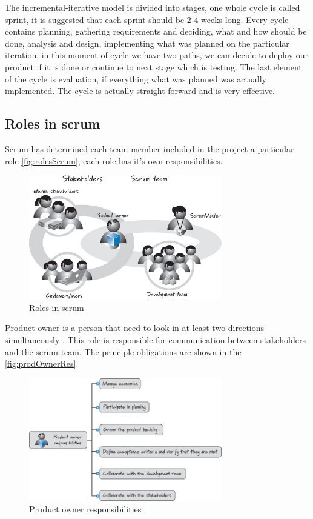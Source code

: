 The incremental-iterative model is divided into stages, one whole cycle is called sprint, it is suggested that each sprint should be 2-4 weeks long. Every cycle contains planning, gathering requirements and deciding, what and how should be done, analysis and design, implementing what was planned on the particular iteration, in this moment of cycle we have two paths, we can decide to deploy our product if it is done or continue to next stage which is testing. The last element of the cycle is evaluation, if everything what was planned was actually implemented. The cycle is actually straight-forward and is very effective.

\subsection{Roles in scrum}
Scrum has determined each team member included in the project a particular role \autoref{fig:rolesScrum}, each role has it's own responsibilities.

\begin{figure}[h]
\caption{Roles in scrum \cite{ScrumBook}}
\label{fig:rolesScrum}
\centering
\includegraphics[width=0.75\textwidth]{img/roles}
\end{figure}

Product owner is a person that need to look in at least two directions simultaneously \cite{ScrumBook}. This role is responsible for communication between stakeholders and the scrum team. The principle obligations are shown in the \autoref{fig:prodOwnerRes}.

\begin{figure}[h]
\caption{Product owner responsibilities \cite{ScrumBook}}
\label{fig:prodOwnerRes}
\centering
\includegraphics[width=0.75\textwidth]{img/prodRes}
\end{figure}

